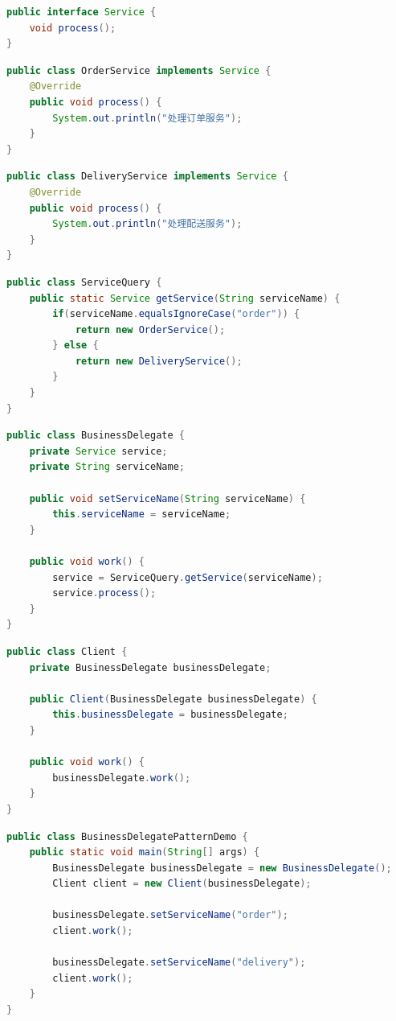 \vspace{0.5cm}

\begin{lstlisting}[language=Java, title=Service.java]
public interface Service {
	void process();
}
\end{lstlisting}

\begin{lstlisting}[language=Java, title=OrderService.java]
public class OrderService implements Service {
	@Override
	public void process() {
		System.out.println("处理订单服务");
	}
}
\end{lstlisting}

\begin{lstlisting}[language=Java, title=DeliveryService.java]
public class DeliveryService implements Service {
	@Override
	public void process() {
		System.out.println("处理配送服务");
	}
}
\end{lstlisting}

\begin{lstlisting}[language=Java, title=ServiceQuery.java]
public class ServiceQuery {
	public static Service getService(String serviceName) {
		if(serviceName.equalsIgnoreCase("order")) {
			return new OrderService();
		} else {
			return new DeliveryService();
		}
	}
}
\end{lstlisting}

\begin{lstlisting}[language=Java, title=BusinessDelegate.java]
public class BusinessDelegate {
	private Service service;
	private String serviceName;

	public void setServiceName(String serviceName) {
		this.serviceName = serviceName;
	}

	public void work() {
		service = ServiceQuery.getService(serviceName);
		service.process();
	}
}
\end{lstlisting}

\begin{lstlisting}[language=Java, title=Client.java]
public class Client {
	private BusinessDelegate businessDelegate;

	public Client(BusinessDelegate businessDelegate) {
		this.businessDelegate = businessDelegate;
	}

	public void work() {
		businessDelegate.work();
	}
}
\end{lstlisting}

\begin{lstlisting}[language=Java, title=BusinessDelegatePatternDemo.java]
public class BusinessDelegatePatternDemo {
	public static void main(String[] args) {
		BusinessDelegate businessDelegate = new BusinessDelegate();
		Client client = new Client(businessDelegate);

		businessDelegate.setServiceName("order");
		client.work();

		businessDelegate.setServiceName("delivery");
		client.work();
	}
}
\end{lstlisting}

